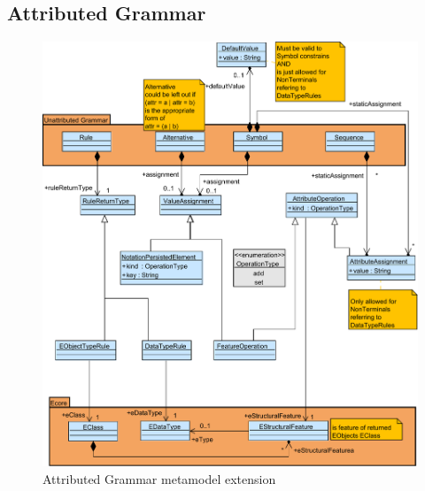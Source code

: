 \subsection{Attributed Grammar}
\begin{figure}
\centering
\includegraphics[scale=0.7]{gfx/ex/Grammar_Attributed} 
\caption{Attributed Grammar metamodel extension}
\label{MM:AEBNF}
\end{figure}

